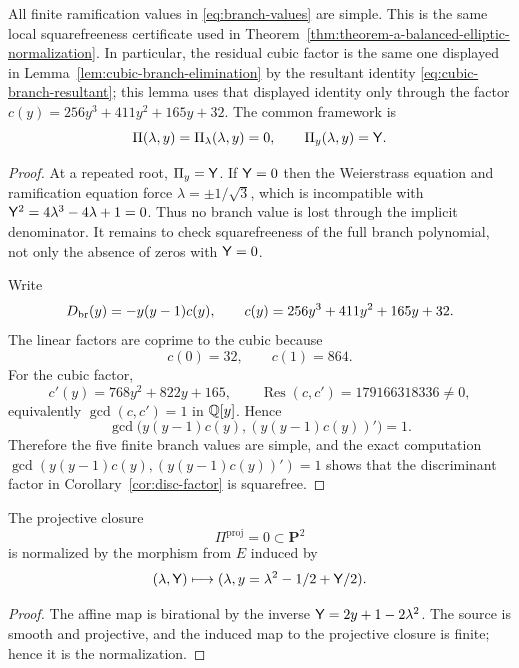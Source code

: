 \begin{lemma}\label{lem:finite-ramification-simple}
All finite ramification values in \eqref{eq:branch-values} are simple.  This is the same local squarefreeness certificate used in Theorem~\ref{thm:theorem-a-balanced-elliptic-normalization}.  In particular, the residual cubic factor is the same one displayed in Lemma~\ref{lem:cubic-branch-elimination} by the resultant identity \eqref{eq:cubic-branch-resultant}; this lemma uses that displayed identity only through the factor \(c(y)=256y^3+411y^2+165y+32\).
The common framework is
\begin{equation}\label{eq:finite-ramification-framework}
\Pi(\lambda,y)=\Pi_\lambda(\lambda,y)=0,
\qquad
\Pi_y(\lambda,y)=\mathsf{Y}.
\end{equation}
\end{lemma}
\begin{proof}
At a repeated root, $\Pi_y=\mathsf{Y}$.  If $\mathsf{Y}=0$ then the Weierstrass equation and ramification equation force $\lambda=\pm1/\sqrt3$, which is incompatible with $\mathsf{Y}^2=4\lambda^3-4\lambda+1=0$.  Thus no branch value is lost through the implicit denominator.  It remains to check squarefreeness of the full branch polynomial, not only the absence of zeros with $\mathsf{Y}=0$.

Write
\[
D_{\rm br}(y)=-y(y-1)c(y),
\qquad
c(y)=256y^3+411y^2+165y+32.
\]
The linear factors are coprime to the cubic because
\[
c(0)=32,
\qquad
c(1)=864.
\]
For the cubic factor,
\[
c'(y)=768y^2+822y+165,
\qquad
\operatorname{Res}(c,c')=179166318336\ne0,
\]
equivalently \(\gcd(c,c')=1\) in \(\mathbb{Q}[y]\).  Hence
\[
\gcd\bigl(y(y-1)c(y),(y(y-1)c(y))'\bigr)=1.
\]
Therefore the five finite branch values are simple, and the exact computation
\(\gcd(y(y-1)c(y),(y(y-1)c(y))')=1\) shows that the discriminant factor in Corollary~\ref{cor:disc-factor} is squarefree.
\end{proof}

\begin{lemma}\label{lem:projective-normalization}
The projective closure
\begin{equation}\label{eq:projective-quartic}
\Pi^{\mathrm{proj}}=0\subset\mathbf P^2
\end{equation}
is normalized by the morphism from $E$ induced by
\begin{equation}\label{eq:normalization-map}
(\lambda,\mathsf{Y})\longmapsto (\lambda,y=\lambda^2-1/2+\mathsf{Y}/2).
\end{equation}
\end{lemma}
\begin{proof}
The affine map is birational by the inverse $\mathsf{Y}=2y+1-2\lambda^2$.  The source is smooth and projective, and the induced map to the projective closure is finite; hence it is the normalization.
\end{proof}

